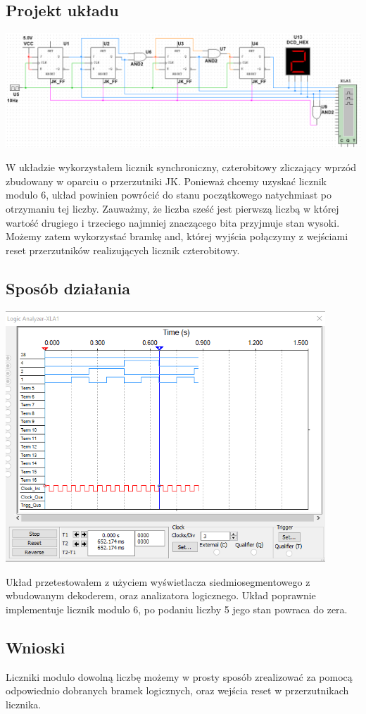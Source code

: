 \documentclass{article}
\begin{document}
        \subsection{Projekt układu}
            \begin{center}
                \includegraphics[width=18cm]{reports/img/Z3D_1.png}\\
            \end{center}
            W układzie wykorzystałem licznik synchroniczny, czterobitowy zliczający wprzód zbudowany w oparciu o przerzutniki JK. Ponieważ chcemy uzyskać licznik modulo 6, układ powinien powrócić do stanu początkowego natychmiast po otrzymaniu tej liczby. Zauważmy, że liczba sześć jest pierwszą liczbą w której wartość drugiego i trzeciego najmniej znaczącego bita przyjmuje stan wysoki. Możemy zatem wykorzystać bramkę and, której wyjścia połączymy z wejściami reset przerzutników realizujących licznik czterobitowy. 
            
        \subsection{Sposób działania}
            \begin{center}
                \includegraphics[width=12cm]{reports/img/Z3D_2.png}\\
            \end{center}
            Układ przetestowałem z użyciem wyświetlacza siedmiosegmentowego z wbudowanym dekoderem, oraz analizatora logicznego. Układ poprawnie implementuje licznik modulo 6, po podaniu liczby 5 jego stan powraca do zera. 
            
        \subsection{Wnioski}
            Liczniki modulo dowolną liczbę możemy w prosty sposób zrealizować za pomocą odpowiednio dobranych bramek logicznych, oraz wejścia reset w przerzutnikach licznika. 
    
\end{document}
